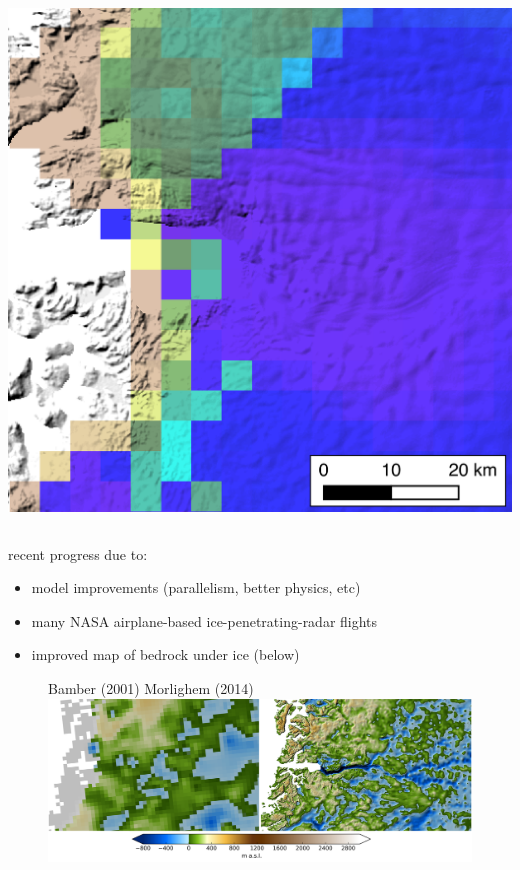 \documentclass[hide notes,intlimits]{beamer}
\begin{document}
\begin{frame}[plain]
\begin{columns}
\medskip
    \includegraphics[width=\textwidth]{jakobshavn-speed-exp-4500m-ba01}
  \end{columns}
\end{frame}


\begin{frame}[plain]

\phantom{foo}

recent progress due to:

\begin{itemize}
\item model improvements (parallelism, better physics, etc)
\item many NASA airplane-based ice-penetrating-radar flights
\item improved map of bedrock under ice (below)
\end{itemize}

  \begin{figure}
    \small{Bamber (2001) \hspace{7em} Morlighem (2014)}
    \includegraphics[width=12cm]{jako_bed}
 \end{figure}
\end{frame}
\end{document}
